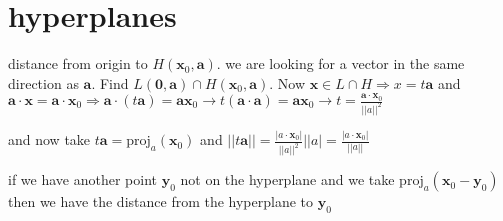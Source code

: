 \documentclass[letterpaper]{article}
\begin{document}
\section*{hyperplanes}
distance from origin to $H(\mathbf{x}_0,\mathbf{a})$. we are looking for a vector in the same direction as $\mathbf{a}$. Find $L(\mathbf{0},\mathbf{a})\cap H(\mathbf{x}_0,\mathbf{a})$. Now $\mathbf{x}\in L\cap H\Rightarrow x=t\mathbf{a} $ and $\mathbf{a}\cdot\mathbf{x}=\mathbf{a}\cdot\mathbf{x}_0\Rightarrow \mathbf{a}\cdot(t\mathbf{a})=\mathbf{a}\mathbf{x}_0\to t(\mathbf{a}\cdot\mathbf{a})=\mathbf{a}\mathbf{x}_0\to t=\frac{\mathbf{a}\cdot \mathbf{x}_0}{||a||^2}$

and now take $t\mathbf{a}=\text{proj}_a(\mathbf{x}_0)$ and $||t\mathbf{a}||=\frac{|a\cdot\mathbf{x}_0|}{||a||^2}||a|=\frac{|a\cdot\mathbf{x}_0|}{||a||}$

if we have another point $\mathbf{y}_0$ not on the hyperplane and we take $\text{proj}_{a}(\mathbf{x}_0-\mathbf{y}_0)$ then we have the distance from the hyperplane to $\mathbf{y}_0$
\end{document}
